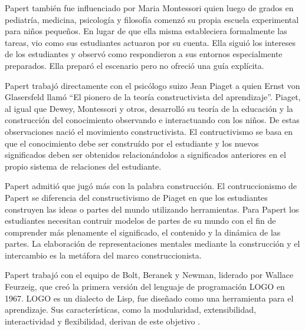 Papert también fue influenciado por Maria Montessori quien luego de grados en
pediatría, medicina, psicología y filosofía comenzó su propia escuela
experimental para niños pequeños. En lugar de que ella misma estableciera
formalmente las tareas, vio como sus estudiantes actuaron por su cuenta. Ella
siguió los intereses de los estudiantes y observó como respondieron a sus
entornos especialmente preparados. Ella preparó el escenario pero no ofreció una
guía explícita\cite{historia:2014}.

Papert trabajó directamente con el psicólogo suizo Jean Piaget a quien Ernst von
Glasersfeld llamó \enquote{El pionero de la teoría constructivista del
    aprendizaje}. 
Piaget, al igual que Dewey, Montessori y otros, desarrolló su teoría de la
educación y la construcción del conocimiento observando e interactuando con los
niños. De estas observaciones nació el movimiento constructivista. El
contructivismo se basa en que el conocimiento debe ser construído por el
estudiante y los nuevos significados deben ser obtenidos relacionándolos a
significados anteriores en el propio sistema de relaciones del
estudiante\cite{historia:2014}. 

Papert admitió que jugó más con la palabra construcción. El contruccionismo de
Papert se diferencia del constructivismo de Piaget en que los estudiantes
construyen las ideas o partes del mundo utilizando herramientas. Para Papert los
estudiantes necesitan contruir modelos de partes de su mundo con el fin de
comprender más plenamente el significado, el 
contenido y la dinámica de las partes. La elaboración de representaciones
mentales mediante la construcción y el intercambio es la metáfora del marco
construccionista\cite{historia:2014}.


Papert trabajó con el equipo de Bolt, Beranek y Newman, liderado por Wallace
Feurzeig, que creó la primera versión del lenguaje de programación LOGO en 1967.
LOGO es un dialecto de Lisp, fue diseñado como una herramienta para el
aprendizaje. Sus características, como la modularidad, extensibilidad,
interactividad y flexibilidad, derivan de este objetivo \cite{logo:sg}.

